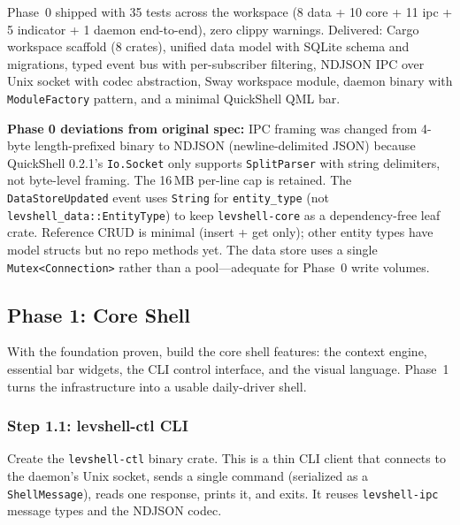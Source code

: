 \documentclass[11pt,a4paper]{article}
\begin{document}
\begin{designbox}
Phase~0 shipped with 35 tests across the workspace (8 data + 10 core + 11 ipc + 5 indicator + 1 daemon end-to-end), zero clippy warnings. Delivered: Cargo workspace scaffold (8 crates), unified data model with SQLite schema and migrations, typed event bus with per-subscriber filtering, NDJSON IPC over Unix socket with codec abstraction, Sway workspace module, daemon binary with \texttt{ModuleFactory} pattern, and a minimal QuickShell QML bar.

\textbf{Phase 0 deviations from original spec:} IPC framing was changed from 4-byte length-prefixed binary to NDJSON (newline-delimited JSON) because QuickShell 0.2.1's \texttt{Io.Socket} only supports \texttt{SplitParser} with string delimiters, not byte-level framing. The 16\,MB per-line cap is retained. The \texttt{DataStoreUpdated} event uses \texttt{String} for \texttt{entity\_type} (not \texttt{levshell\_data::EntityType}) to keep \texttt{levshell-core} as a dependency-free leaf crate. Reference CRUD is minimal (insert + get only); other entity types have model structs but no repo methods yet. The data store uses a single \texttt{Mutex<Connection>} rather than a pool---adequate for Phase~0 write volumes.
\end{designbox}

\subsection{Phase 1: Core Shell}

With the foundation proven, build the core shell features: the context engine, essential bar widgets, the CLI control interface, and the visual language. Phase~1 turns the infrastructure into a usable daily-driver shell.

\subsubsection{Step 1.1: levshell-ctl CLI}

Create the \texttt{levshell-ctl} binary crate. This is a thin CLI client that connects to the daemon's Unix socket, sends a single command (serialized as a \texttt{ShellMessage}), reads one response, prints it, and exits. It reuses \texttt{levshell-ipc} message types and the NDJSON codec.
\end{document}
